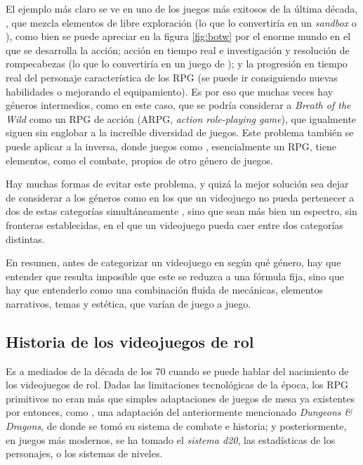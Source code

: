 \smallskip

El ejemplo más claro se ve en uno de los juegos más exitosos de la última década, , que mezcla elementos de libre exploración (lo que lo convertiría en un \textit{sandbox} o ), como bien se puede apreciar en la figura \ref{fig:botw} por el enorme mundo en el que se desarrolla la acción; acción en tiempo real e investigación y resolución de rompecabezas (lo que lo convertiría en un juego de ); y la progresión en tiempo real del personaje característica de los RPG (se puede ir consiguiendo nuevas habilidades o mejorando el equipamiento). Es por eso que muchas veces hay géneros intermedios, como en este caso, que se podría considerar a \textit{Breath of the Wild} como un RPG de acción (ARPG, \textit{action role-playing game}), que igualmente siguen sin englobar a la increíble diversidad de juegos. Este problema también se puede aplicar a la inversa, donde juegos como , esencialmente un RPG, tiene elementos, como el combate, propios de otro género de juegos.

\medskip

Hay muchas formas de evitar este problema, y quizá la mejor solución sea dejar de considerar a los géneros como  en los que un videojuego no pueda pertenecer a dos de estas categorías simultáneamente \citep{Apperley}, sino que sean más bien un espectro, sin fronteras establecidas, en el que un videojuego pueda caer entre dos categorías distintas.

\smallskip

En resumen, antes de categorizar un videojuego en según qué género, hay que entender que resulta imposible que este se reduzca a una fórmula fija, sino que hay que entenderlo como una combinación fluida de mecánicas, elementos narrativos, temas y estética, que varían de juego a juego.

\subsection{Historia de los videojuegos de rol}


Es a mediados de la década de los 70 cuando se puede hablar del nacimiento de los videojuegos de rol. Dadas las limitaciones tecnológicas de la época, los RPG primitivos no eran más que simples adaptaciones de juegos de mesa ya existentes por entonces, como , una adaptación del anteriormente mencionado \textit{Dungeons \& Dragons}, de donde se tomó su sistema de combate e historia; y posteriormente, en juegos más modernos, se ha tomado el \textit{sistema d20}, las estadísticas de los personajes, o los sistemas de niveles. 

